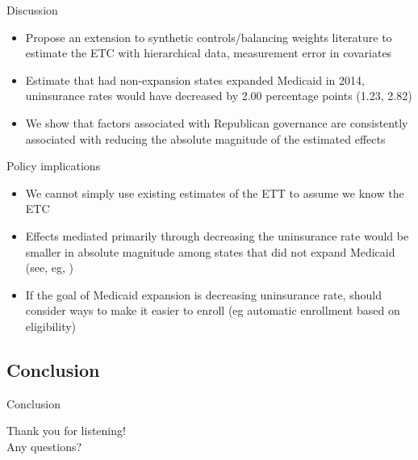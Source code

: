 \documentclass[hyperref={pdfpagelabels=false}]{beamer}
\begin{document}
\begin{frame}{Discussion}
\begin{itemize}
    \item Propose an extension to synthetic controls/balancing weights literature to estimate the ETC with hierarchical data, measurement error in covariates \bigskip
    \item Estimate that had non-expansion states expanded Medicaid in 2014, uninsurance rates would have decreased by 2.00 percentage points (1.23, 2.82) \bigskip
    \item We show that factors associated with Republican governance are consistently associated with reducing the absolute magnitude of the estimated effects
\end{itemize}
\end{frame}

\begin{frame}{Policy implications}
    \begin{itemize}
        \item We cannot simply use existing estimates of the ETT to assume we know the ETC \bigskip
        \item Effects mediated primarily through decreasing the uninsurance rate would be smaller in absolute magnitude among states that did not expand Medicaid (see, eg, \cite{wherry2016early}) \bigskip
        \item If the goal of Medicaid expansion is decreasing uninsurance rate, should consider ways to make it easier to enroll (eg automatic enrollment based on eligibility)
    \end{itemize}
\end{frame}

\subsection{Conclusion}
\begin{frame}{Conclusion}
\begin{center}
Thank you for listening! \\ 
\newline Any questions?
\end{center}
\end{frame}
\end{document}
